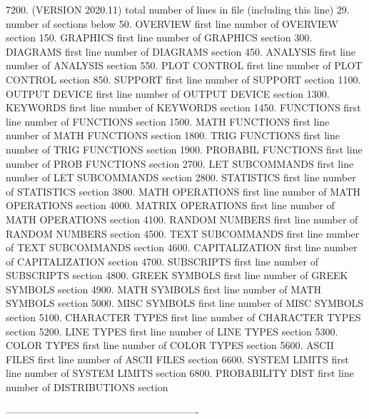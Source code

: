 7200.       (VERSION 2020.11)  total number of lines in file (including this line)
29.                          number of     sections below
   50.    OVERVIEW           first line number of OVERVIEW          section
  150.    GRAPHICS           first line number of GRAPHICS          section
  300.    DIAGRAMS           first line number of DIAGRAMS          section
  450.    ANALYSIS           first line number of ANALYSIS          section
  550.    PLOT CONTROL       first line number of PLOT CONTROL      section
  850.    SUPPORT            first line number of SUPPORT           section
 1100.    OUTPUT DEVICE      first line number of OUTPUT DEVICE     section
 1300.    KEYWORDS           first line number of KEYWORDS          section
 1450.    FUNCTIONS          first line number of FUNCTIONS         section
 1500.    MATH FUNCTIONS     first line number of MATH FUNCTIONS    section
 1800.    TRIG FUNCTIONS     first line number of TRIG FUNCTIONS    section
 1900.    PROBABIL FUNCTIONS first line number of PROB FUNCTIONS    section
 2700.    LET SUBCOMMANDS    first line number of LET SUBCOMMANDS   section
 2800.    STATISTICS         first line number of STATISTICS        section
 3800.    MATH OPERATIONS    first line number of MATH OPERATIONS   section
 4000.    MATRIX OPERATIONS  first line number of MATH OPERATIONS   section
 4100.    RANDOM NUMBERS     first line number of RANDOM NUMBERS    section
 4500.    TEXT SUBCOMMANDS   first line number of TEXT SUBCOMMANDS  section
 4600.    CAPITALIZATION     first line number of CAPITALIZATION    section
 4700.    SUBSCRIPTS         first line number of SUBSCRIPTS        section
 4800.    GREEK SYMBOLS      first line number of GREEK SYMBOLS     section
 4900.    MATH SYMBOLS       first line number of MATH SYMBOLS      section
 5000.    MISC SYMBOLS       first line number of MISC SYMBOLS      section
 5100.    CHARACTER TYPES    first line number of CHARACTER TYPES   section
 5200.    LINE TYPES         first line number of LINE TYPES        section
 5300.    COLOR TYPES        first line number of COLOR TYPES       section
 5600.    ASCII FILES        first line number of ASCII FILES       section
 6600.    SYSTEM LIMITS      first line number of SYSTEM LIMITS     section
 6800.    PROBABILITY DIST   first line number of DISTRIBUTIONS     section
 
----------------------------------------------------------
















